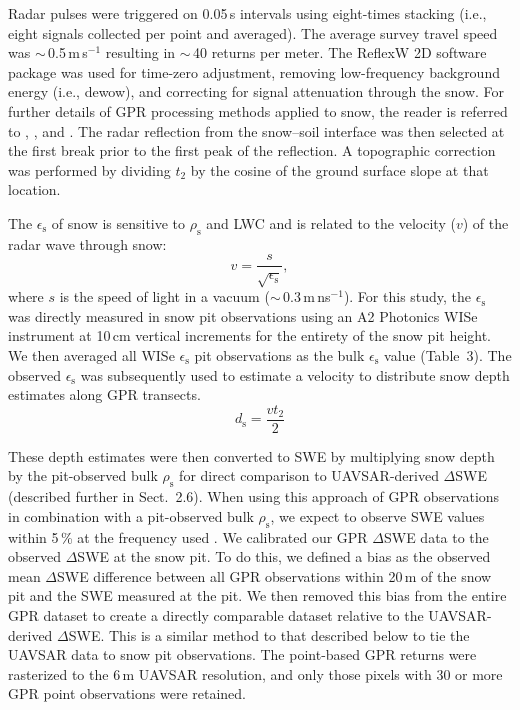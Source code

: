 Radar pulses were triggered on 0.05\,s intervals using eight-times stacking (i.e., eight signals collected per point and averaged). The average survey travel speed was $\sim$\,0.5\,m\,s$^{-1}$ resulting in $\sim$\,40 returns per meter. The ReflexW 2D software package \citep{sandmeierREFLEXW2022} was used for time-zero adjustment, removing low-frequency background energy (i.e., dewow), and correcting for signal attenuation through the snow. For further details of GPR processing methods applied to snow, the reader is referred to \citet{bonnellSpatiotemporalVariationsLiquid2021}, \citet{mcgrathSpatiallyExtensiveGroundPenetrating2019}, and \citet{webbCombiningGroundPenetrating2018}. The radar reflection from the snow--soil interface was then selected at the first break prior to the first peak of the reflection. A topographic correction was performed by dividing $t_2$ by the cosine of the ground surface slope at that location.

The $\epsilon_\mathrm{s}$ of snow is sensitive to $\rho_\mathrm{s}$ and LWC \citep{bradfordEstimatingPorosityGroundpenetrating2009, heiligSeasonalDiurnalCycles2015, webbCombiningGroundPenetrating2018} and is related to the velocity ($v$) of the radar wave through snow:
\begin{equation}
v = \frac{s}{\sqrt{\epsilon_\mathrm{s}}},
\end{equation}
where $s$ is the speed of light in a vacuum ($\sim$\,0.3\,m\,ns$^{-1}$). For this study, the $\epsilon_\mathrm{s}$ was directly measured in snow pit observations using an A2 Photonics WISe instrument at 10\,cm vertical increments for the entirety of the snow pit height. We then averaged all WISe $\epsilon_\mathrm{s}$ pit observations as the bulk $\epsilon_\mathrm{s}$ value (Table~3). The observed $\epsilon_\mathrm{s}$ was subsequently used to estimate a velocity to distribute snow depth estimates along GPR transects.
\begin{equation}
d_\mathrm{s} = \frac{v t_2}{2}
\end{equation}

These depth estimates were then converted to SWE by multiplying snow depth by the pit-observed bulk $\rho_\mathrm{s}$ for direct comparison to UAVSAR-derived $\Delta$SWE (described further in Sect.~2.6). When using this approach of GPR observations in combination with a pit-observed bulk $\rho_\mathrm{s}$, we expect to observe SWE values within 5\,\% at the frequency used \citep{marshallEstimatingAlpineSnowpack2005}. We calibrated our GPR $\Delta$SWE data to the observed $\Delta$SWE at the snow pit. To do this, we defined a bias as the observed mean $\Delta$SWE difference between all GPR observations within 20\,m of the snow pit and the SWE measured at the pit. We then removed this bias from the entire GPR dataset to create a directly comparable dataset relative to the UAVSAR-derived $\Delta$SWE. This is a similar method to that described below to tie the UAVSAR data to snow pit observations. The point-based GPR returns were rasterized to the 6\,m UAVSAR resolution, and only those pixels with 30 or more GPR point observations were retained.


